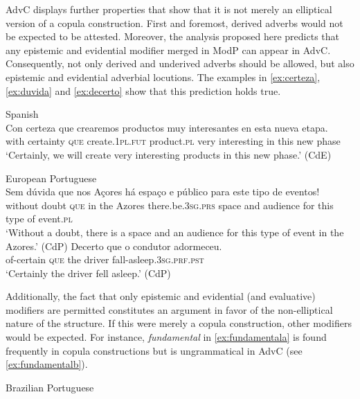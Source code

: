  AdvC displays further properties that show that it is not  merely an elliptical version  of a copula construction. First and foremost,  derived adverbs would not be expected to be attested. Moreover, the analysis proposed here predicts that any epistemic and evidential  modifier merged in ModP can appear in AdvC. Consequently,  not only derived and underived adverbs should be allowed, but also epistemic and evidential adverbial locutions. The examples in \eqref{ex:certeza}, \eqref{ex:duvida} and \eqref{ex:decerto} show that this prediction holds true.\largerpage[-2]
 
\ea
\ea\label{ex:certeza}
		Spanish\\
\gll  Con certeza que crearemos productos muy interesantes en esta nueva etapa. \\
 		with certainty \textsc{que} create.\textsc{1pl.fut} product.\textsc{pl} very interesting in this new phase\\
 		\glt `Certainly, we will create very interesting products in this new phase.' (CdE)

 		\ex\label{ex:duvida} European Portuguese\\ \gll   Sem dúvida que nos Açores há espaço e público para este tipo de eventos! \\
 		without doubt \textsc{que} {in the} Azores there.be.\textsc{3sg.prs} space and audience for this type of event.\textsc{pl}\\
 		\glt `Without a doubt, there is a space and an audience for this type of event in the Azores.' (CdP)
 		\ex\label{ex:decerto}  
 		\gll Decerto que o condutor adormeceu. \\
 		of-certain \textsc{que} the driver fall-asleep.\textsc{3sg.prf.pst}\\
 		\glt `Certainly the driver fell asleep.' (CdP)
 	\z
 \z
 
Additionally, the fact that only epistemic and evidential (and evaluative) modifiers are permitted constitutes an argument in favor of the non-elliptical nature of the structure. If this were merely a copula construction,  other  modifiers would be expected. For instance,  \emph{fundamental} in \eqref{ex:fundamentala}  is found frequently in copula constructions but is  ungrammatical in AdvC (see \ref{ex:fundamentalb}).\largerpage[2]

\ea Brazilian Portuguese
\z
\z 



